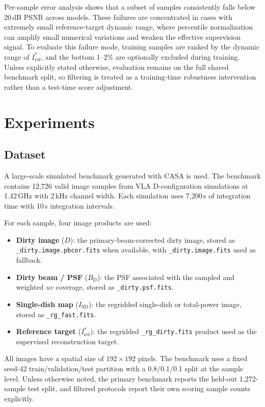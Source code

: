 \documentclass[twocolumn]{aastex631}
\begin{document}
Per-sample error analysis shows that a subset of samples consistently falls below 20\,dB PSNR across models.
These failures are concentrated in cases with extremely small reference-target dynamic range, where percentile normalization can amplify small numerical variations and weaken the effective supervision signal.
To evaluate this failure mode, training samples are ranked by the dynamic range of $I_{\mathrm{ref}}^*$, and the bottom 1--2\% are optionally excluded during training.
Unless explicitly stated otherwise, evaluation remains on the full shared benchmark split, so filtering is treated as a training-time robustness intervention rather than a test-time score adjustment.

\section{Experiments}
\label{sec:experiments}

\subsection{Dataset}

A large-scale simulated benchmark generated with CASA \citep{CASA2022} is used.
The benchmark contains 12,726 valid image samples from VLA D-configuration simulations at 1.42\,GHz with 2\,kHz channel width.
Each simulation uses 7,200\,s of integration time with 10\,s integration intervals.

For each sample, four image products are used:
\begin{itemize}
	\item \textbf{Dirty image} ($D$): the primary-beam-corrected dirty image, stored as \texttt{\_dirty.image.pbcor.fits} when available, with \texttt{\_dirty.image.fits} used as fallback.
	\item \textbf{Dirty beam / PSF} ($B_{\mathrm{D}}$): the PSF associated with the sampled and weighted $uv$ coverage, stored as \texttt{\_dirty.psf.fits}.
	\item \textbf{Single-dish map} ($I_{\mathrm{SD}}$): the regridded single-dish or total-power image, stored as \texttt{\_rg\_fast.fits}.
	\item \textbf{Reference target} ($I_{\mathrm{ref}}^*$): the regridded \texttt{\_rg\_dirty.fits} product used as the supervised reconstruction target.
\end{itemize}

All images have a spatial size of $192 \times 192$ pixels.
The benchmark uses a fixed seed-42 train/validation/test partition with a 0.8/0.1/0.1 split at the sample level.
Unless otherwise noted, the primary benchmark reports the held-out 1,272-sample test split, and filtered protocols report their own scoring sample counts explicitly.
\end{document}

